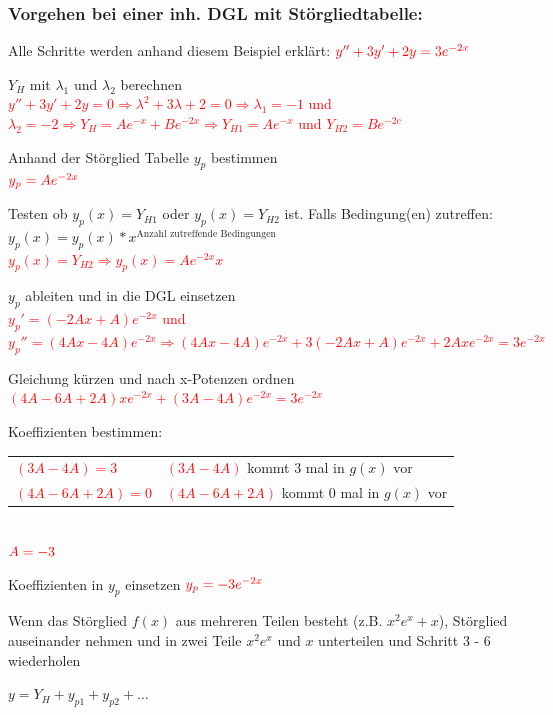 \subsubsection{Vorgehen bei einer inh. DGL mit Störgliedtabelle: }
	Alle Schritte werden anhand diesem Beispiel erklärt: $\textcolor{red}{y'' + 3y' + 2y = 3e^{-2x}}$
	\begin{compactenum}
		\item 	$Y_H$ mit $\lambda_1$ und $\lambda_2$ berechnen \\
				\textcolor{red}{$y'' + 3y' + 2y = 0 \Rightarrow \lambda^2 + 3\lambda + 2 = 0 \Rightarrow \lambda_1 = -1$ und $\lambda_2 = -2 \Rightarrow Y_H = Ae^{-x} + Be^{-2x} \Rightarrow Y_{H1} = Ae^{-x}$ und $ Y_{H2} = Be^{-2c}$}
		\item 	Anhand der Störglied Tabelle $y_p$ bestimmen \\
				$\textcolor{red}{y_p = Ae^{-2x}}$
		\item 	Testen ob $y_p(x) = Y_{H1}$ oder $y_p(x) = Y_{H2}$ ist. 
				Falls Bedingung(en) zutreffen: $y_p(x)= y_p(x) * x^{\text{Anzahl zutreffende Bedingungen}}$ \\
				\textcolor{red}{$ y_p(x) = Y_{H2} \Rightarrow y_p(x) = Ae^{-2x}x $}
		\item 	$y_p$ ableiten und in die DGL einsetzen \\
				\textcolor{red}{$y_p'=(-2Ax + A)e^{-2x}$ und $y_p''=(4Ax - 4A)e^{-2x} \Rightarrow (4Ax - 4A)e^{-2x} + 3(-2Ax + A)e^{-2x} + 2Axe^{-2x} = 3e^{-2x}$}
		\item Gleichung kürzen und nach x-Potenzen ordnen \\
				\textcolor{red}{$(4A - 6A + 2A)xe^{-2x} + (3A - 4A)e^{-2x}=3e^{-2x}$}
		\item 	Koeffizienten bestimmen: \\				
				\begin{tabular}{ll}
					\textcolor{red}{$(3A - 4A) = 3$} & \textcolor{red}{$(3A - 4A)$} kommt 3 mal in $g(x)$ vor \\
					\textcolor{red}{$(4A - 6A + 2A) = 0$} & \textcolor{red}{$(4A - 6A + 2A)$} kommt 0 mal in $g(x)$ vor \\
				\end{tabular} \\
				$\textcolor{red}{A = -3}$
		\item 	Koeffizienten in $y_p$ einsetzen
				$\textcolor{red}{y_p = -3e^{-2x}}$
		\item 	Wenn das Störglied $f(x)$ aus mehreren Teilen besteht (z.B. $x^2e^x + x$), Störglied auseinander nehmen und in zwei Teile $x^2e^x$ und $x$ unterteilen und Schritt 3 - 6 wiederholen
		\item 	$y = Y_H + y_{p1} + y_{p2} + \dots$
	\end{compactenum}
	
